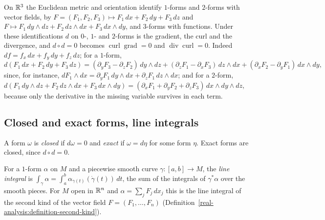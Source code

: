 \begin{example}\label{differential-forms:example-forms-r3}
On $\mathbb{R}^3$ the Euclidean metric and orientation identify $1$-forms and $2$-forms with vector fields, by $F = (F_1, F_2, F_3) \mapsto F_1\,dx + F_2\,dy + F_3\,dz$ and
$F \mapsto F_1\,dy \wedge dz + F_2\,dz \wedge dx + F_3\,dx \wedge dy$, and $3$-forms with functions. Under these identifications $d$ on $0$-, $1$- and $2$-forms is the gradient, the curl and the divergence, and $d \circ d = 0$ becomes
$\operatorname{curl}\operatorname{grad} = 0$ and $\operatorname{div}\operatorname{curl} = 0$. Indeed $df = f_x\,dx + f_y\,dy + f_z\,dz$; for a $1$-form,
\[
d(F_1\,dx + F_2\,dy + F_3\,dz) = (\partial_yF_3 - \partial_zF_2)\,dy \wedge dz + (\partial_zF_1 - \partial_xF_3)\,dz \wedge dx + (\partial_xF_2 - \partial_yF_1)\,dx \wedge dy,
\]
since, for instance, $dF_1 \wedge dx = \partial_yF_1\,dy \wedge dx + \partial_zF_1\,dz \wedge dx$; and for a $2$-form,
$d(F_1\,dy \wedge dz + F_2\,dz \wedge dx + F_3\,dx \wedge dy) = (\partial_xF_1 + \partial_yF_2 + \partial_zF_3)\,dx \wedge dy \wedge dz$, because only the derivative in the missing variable
survives in each term.
\end{example}

\subsection{Closed and exact forms, line integrals}\label{differential-forms:subsection-closed-exact}

\begin{definition}\label{differential-forms:definition-closed-exact}
A form $\omega$ is \emph{closed} if $d\omega = 0$ and \emph{exact} if $\omega = d\eta$ for some form $\eta$. Exact forms are closed, since $d \circ d = 0$.
\end{definition}

\begin{definition}\label{differential-forms:definition-line-integral}
For a $1$-form $\alpha$ on $M$ and a piecewise smooth curve $\gamma \colon [a, b] \to M$, the \emph{line integral} is $\int_\gamma\alpha = \int_a^b\alpha_{\gamma(t)}(\dot\gamma(t))\,dt$, the sum of the integrals of $\gamma^*\alpha$ over the smooth pieces. For $M$ open in $\mathbb{R}^n$ and $\alpha = \sum_jF_j\,dx_j$ this is the line integral of the second kind of the vector field
$F = (F_1, \ldots, F_n)$ (Definition~\ref{real-analysis:definition-second-kind}).
\end{definition}

